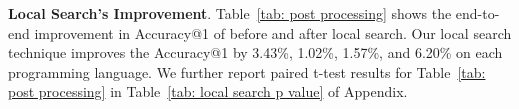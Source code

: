 
\noindent \textbf{Local Search's Improvement}. 
Table~\ref{tab: post processing} shows the end-to-end 
improvement in Accuracy@1 of \detector{} before and after local search.
Our local search technique improves the Accuracy@1 by 3.43\%, 1.02\%, 1.57\%, and 6.20\% on each programming language. We further report paired t-test results for Table~\ref{tab: post processing} in Table~\ref{tab: local search p value} of Appendix. 

